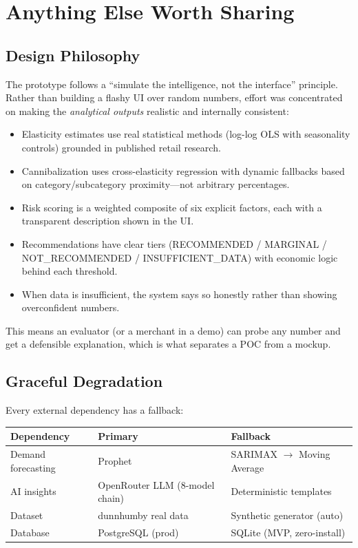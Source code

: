 \documentclass[11pt, a4paper]{article}
\begin{document}
\section{Anything Else Worth Sharing}

\subsection{Design Philosophy}
The prototype follows a ``simulate the intelligence, not the interface'' principle. Rather than building a flashy UI over random numbers, effort was concentrated on making the \textit{analytical outputs} realistic and internally consistent:

\begin{itemize}[leftmargin=1.5em]
    \item Elasticity estimates use real statistical methods (log-log OLS with seasonality controls) grounded in published retail research.
    \item Cannibalization uses cross-elasticity regression with dynamic fallbacks based on category/subcategory proximity---not arbitrary percentages.
    \item Risk scoring is a weighted composite of six explicit factors, each with a transparent description shown in the UI.
    \item Recommendations have clear tiers (RECOMMENDED / MARGINAL / NOT\_RECOMMENDED / INSUFFICIENT\_DATA) with economic logic behind each threshold.
    \item When data is insufficient, the system says so honestly rather than showing overconfident numbers.
\end{itemize}

This means an evaluator (or a merchant in a demo) can probe any number and get a defensible explanation, which is what separates a POC from a mockup.

\subsection{Graceful Degradation}
Every external dependency has a fallback:

\begin{tabularx}{\textwidth}{| l | l | X |}
    \hline
    \textbf{Dependency} & \textbf{Primary} & \textbf{Fallback} \\
    \hline\hline
    Demand forecasting & Prophet & SARIMAX $\rightarrow$ Moving Average \\
    \hline
    AI insights        & OpenRouter LLM (8-model chain) & Deterministic templates \\
    \hline
    Dataset            & dunnhumby real data & Synthetic generator (auto) \\
    \hline
    Database           & PostgreSQL (prod) & SQLite (MVP, zero-install) \\
    \hline
\end{tabularx}
\end{document}

